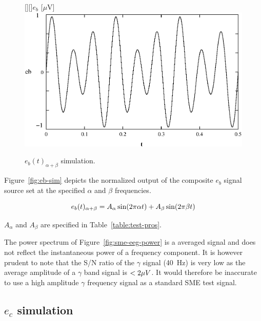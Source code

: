 \begin{figure}[htbp]
\begin{center}
	[][]{$e_b$ [$\mu$V]}
	\includegraphics[width=\textwidth]{eb-sim.eps}
    \caption{$e_b(t)_{\alpha + \beta}$ simulation.}
    \label{fig:eb-sim}
\end{center}
\end{figure}

Figure~\vref{fig:eb-sim} depicts the normalized output of the
composite $e_b$ signal source set at the specified $\alpha$ and
$\beta$ frequencies.

\begin{equation} \label{eq:theta-sim}
	e_b(t)_{\alpha + \beta} = A_{\alpha}\sin\/(2\pi\alpha\/t) +
	A_{\beta}\sin\/(2\pi\beta\/t)
\end{equation}

$A_{\alpha}$ and $A_{\beta}$ are specified in
Table~\vref{table:test-pros}.

The power spectrum of Figure~\vref{fig:sme-eeg-power} is a averaged
signal and does not reflect the instantaneous power of a frequency
component. It is however prudent to note that the S/N ratio of the
$\gamma$ signal (40~Hz) is very low as the average amplitude of a
$\gamma$ band signal is $<2\mu\/V$. It would therefore be inaccurate
to use a high amplitude $\gamma$ frequency signal as a standard SME
test signal.


\subsection{$e_c$ simulation}

